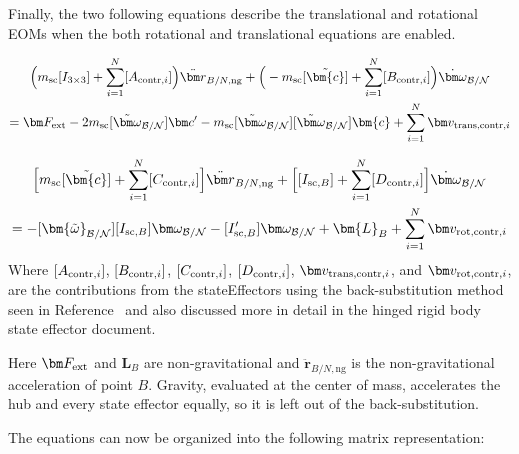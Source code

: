 Finally, the two following equations describe the translational and rotational EOMs when the both rotational and translational equations are enabled.

\begin{multline}
\Big(m_{\text{sc}} [I_{3\times3}] +\sum_{i=1}^{N}[A_{\textnormal{contr},i}]\Big)\ddot{\bm r}_{B/N,\text{ng}}+\Big(-m_{\text{sc}} [\tilde{\bm{c}}] +\sum_{i=1}^{N}[B_{\textnormal{contr},i}]\Big) \dot{\bm\omega}_{\cal B/N} \\
= \bm F_{\textnormal{ext}} 	- 2 m_{\text{sc}} [\tilde{\bm\omega}_{\cal B/N}] \bm c'
-m_{\text{sc}} [\tilde{\bm\omega}_{\cal B/N}][\tilde{\bm\omega}_{\cal B/N}]\bm{c}
+\sum_{i=1}^{N}\bm v_{\textnormal{trans,contr},i}
\label{eq:Rbddot8}
\end{multline}

\begin{multline}
\Big[m_{\text{sc}}[\tilde{\bm{c}}] +\sum\limits_{i=1}^{N}[C_{\textnormal{contr},i}]\Big]\ddot{\bm r}_{B/N,\text{ng}}+\Big[[I_{\text{sc},B}]+\sum\limits_{i=1}^{N}[D_{\textnormal{contr},i}]\Big]\dot{\bm\omega}_{\cal B/N}
\\
= -[\bm{\tilde{\omega}}_{\cal B/N}] [I_{\text{sc},B}] \bm\omega_{\cal B/N}
- [I'_{\text{sc},B}] \bm\omega_{\cal B/N} + \bm{L}_B +\sum\limits_{i=1}^{N}\bm v_{\textnormal{rot,contr},i}
\label{eq:Final9}
\end{multline}
Where $[A_{\textnormal{contr},i}]$, $[B_{\textnormal{contr},i}]$, $[C_{\textnormal{contr},i}]$, $[D_{\textnormal{contr},i}]$, $\bm v_{\textnormal{trans,contr},i}$, and $\bm v_{\textnormal{rot,contr},i}$, are the contributions from the stateEffectors using the back-substitution method seen in Reference~\cite{Allard2016rz} and also discussed more in detail in the hinged rigid body state effector document.

Here $\bm F_{\textnormal{ext}}$ and $\bm L_B$ are non-gravitational and $\ddot{\bm r}_{B/N,\text{ng}}$ is the non-gravitational acceleration of point $B$. Gravity, evaluated at the center of mass, accelerates the hub and every state effector equally, so it is left out of the back-substitution.

The equations can now be organized into the following matrix representation:

